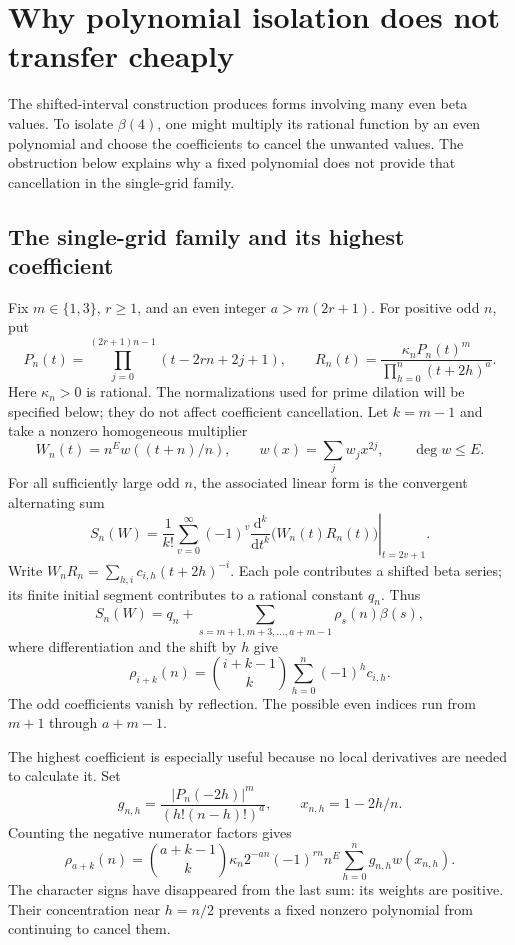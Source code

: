 \section{Why polynomial isolation does not transfer cheaply}\label{sec:isolation}
The shifted-interval construction produces forms involving many even
beta values. To isolate $\beta(4)$, one might multiply its rational
function by an even polynomial and choose the coefficients to cancel
the unwanted values. The obstruction below explains why a fixed
polynomial does not provide that cancellation in the single-grid family.

\subsection{The single-grid family and its highest coefficient}
Fix $m\in\{1,3\}$, $r\ge1$, and an even integer $a>m(2r+1)$.
For positive odd $n$, put
\[
 P_n(t)=\prod_{j=0}^{(2r+1)n-1}(t-2rn+2j+1),\qquad
 R_n(t)=\frac{\kappa_n P_n(t)^m}{\prod_{h=0}^n(t+2h)^a}.
\]
Here $\kappa_n>0$ is rational. The normalizations used for prime dilation
will be specified below; they do not affect coefficient cancellation.
Let $k=m-1$ and take a nonzero homogeneous multiplier
\[
 W_n(t)=n^E w((t+n)/n),\qquad
 w(x)=\sum_j w_jx^{2j},\qquad \deg w\le E.
\]
For all sufficiently large odd $n$, the associated linear form is the
convergent alternating sum
\[
 S_n(W)=\frac1{k!}\sum_{v=0}^{\infty}(-1)^v
       \left.\frac{\mathrm d^k}{\mathrm dt^k}
                  \bigl(W_n(t)R_n(t)\bigr)\right|_{t=2v+1}.
\]
Write $W_nR_n=\sum_{h,i}c_{i,h}(t+2h)^{-i}$. Each pole contributes a
shifted beta series; its finite initial segment contributes to a rational
constant $q_n$. Thus
\[
 S_n(W)=q_n+\sum_{s=m+1,m+3,\ldots,a+m-1}\rho_s(n)\beta(s),
\]
where differentiation and the shift by $h$ give
\begin{equation}\label{eq:isolation-rho}
 \rho_{i+k}(n)=\binom{i+k-1}{k}\sum_{h=0}^n(-1)^h c_{i,h}.
\end{equation}
The odd coefficients vanish by reflection. The possible even indices
run from $m+1$ through $a+m-1$.

The highest coefficient is especially useful because no local derivatives
are needed to calculate it. Set
\[
 g_{n,h}=\frac{|P_n(-2h)|^m}{(h!(n-h)!)^a},\qquad x_{n,h}=1-2h/n.
\]
Counting the negative numerator factors gives
\begin{equation}\label{eq:positive-average}
 \rho_{a+k}(n)=\binom{a+k-1}{k}\kappa_n2^{-an}(-1)^{rn}n^E
                    \sum_{h=0}^n g_{n,h}w(x_{n,h}).
\end{equation}
The character signs have disappeared from the last sum: its weights
are positive. Their concentration near $h=n/2$ prevents a fixed
nonzero polynomial from continuing to cancel them.


